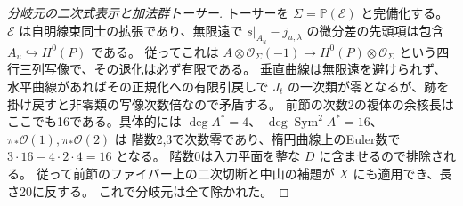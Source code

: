 \begin{proof}[分岐元の二次式表示と加法群トーサー]
トーサーを $\Sigma=\mathbb P(\mathcal E)$ と完備化する。
$\mathcal E$ は自明線束同士の拡張であり、無限遠で
$s|_{A_u}-j_{u,\lambda}$ の微分差の先頭項は包含 $A_u\hookrightarrow H^0(P)$ である。
従ってこれは $A\otimes\mathcal O_\Sigma(-1)\to H^0(P)\otimes\mathcal O_\Sigma$
という四行三列写像で、その退化は必ず有限である。
垂直曲線は無限遠を避けられず、水平曲線があればその正規化への有限引戻しで
$J_t$ の一次類が零となるが、跡を掛け戻すと非零類の写像次数倍なので矛盾する。
前節の次数2の複体の余核長はここでも16である。具体的には $\deg A^*=4$、
$\deg\operatorname{Sym}^2 A^*=16$、$\pi_*\mathcal O(1),\pi_*\mathcal O(2)$ は
階数2,3で次数零であり、楕円曲線上のEuler数で $3\cdot16-4\cdot2\cdot4=16$ となる。
階数0は入力平面を整な $D$ に含ませるので排除される。
従って前節のファイバー上の二次切断と中山の補題が $X$ にも適用でき、長さ20に反する。
これで分岐元は全て除かれた。
\end{proof}

